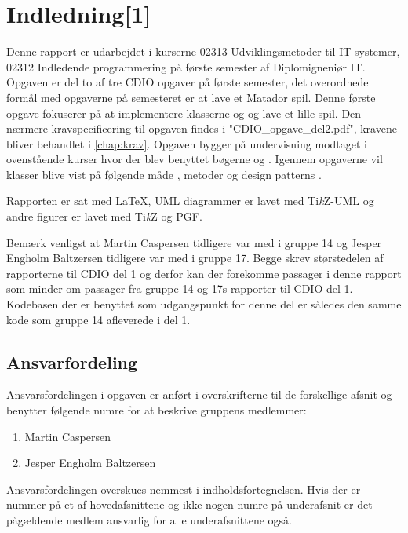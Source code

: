 \chapter{Indledning[1]}\label{chap:indledning}
Denne rapport er udarbejdet i kurserne 02313 Udviklingsmetoder til IT-systemer, 02312 Indledende programmering på første semester af Diplomigneniør IT. Opgaven er del to af tre CDIO opgaver på første semester, det overordnede formål med opgaverne på semesteret er at lave et Matador spil. Denne første opgave fokuserer på at implementere klasserne  og  og lave et lille spil. Den nærmere kravspecificering til opgaven findes i "CDIO\_opgave\_del2.pdf"\cite{CDIOdel2}, kravene bliver behandlet i \vref{chap:krav}. Opgaven bygger på undervisning modtaget i ovenstående kurser hvor der blev benyttet bøgerne \cite{umlbook} og \cite{javabook}. Igennem opgaverne vil klasser blive vist på følgende måde , metoder  og design patterns .

Rapporten er sat med \LaTeX, UML diagrammer er lavet med Ti\emph{k}Z-UML og andre figurer er lavet med Ti\emph{k}Z og \textsc{PGF}.

Bemærk venligst at Martin Caspersen tidligere var med i gruppe 14 og Jesper Engholm Baltzersen tidligere var med i gruppe 17. Begge skrev størstedelen af rapporterne til CDIO del 1 og derfor kan der forekomme passager i denne rapport som minder om passager fra gruppe 14 og 17s rapporter til CDIO del 1. Kodebasen der er benyttet som udgangspunkt for denne del er således den samme kode som gruppe 14 afleverede i del 1.

\section{Ansvarfordeling}\label{sec:indledning:ansvarsfordeling}

Ansvarsfordelingen i opgaven er anført i overskrifterne til de forskellige afsnit og benytter følgende numre for at beskrive gruppens medlemmer:
\begin{enumerate}
\item Martin Caspersen
\item Jesper Engholm Baltzersen
\end{enumerate}
Ansvarsfordelingen overskues nemmest i indholdsfortegnelsen. Hvis der er nummer på et af hovedafsnittene og ikke nogen numre på underafsnit er det pågældende medlem ansvarlig for alle underafsnittene også.

